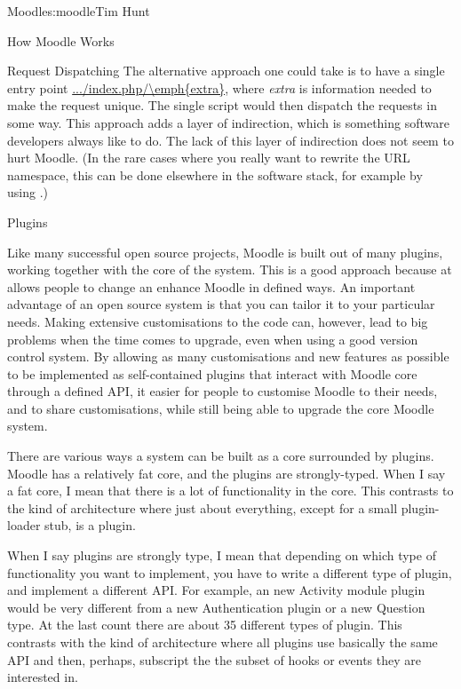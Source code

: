 \begin{aosachapter}{Moodle}{s:moodle}{Tim Hunt}
\begin{aosasect1}{How Moodle Works}
\begin{aosasect2}{Request Dispatching}
The alternative approach one could take is to have a single entry
point \url{.../index.php/\emph{extra}}, where \emph{extra} is
information needed to make the request unique. The single script
 would then dispatch the requests in some way. This
approach adds a layer of indirection, which is something software
developers always like to do. The lack of this layer of indirection
does not seem to hurt Moodle. (In the rare cases where you really want
to rewrite the URL namespace, this can be done elsewhere in the
software stack, for example by using .)

\end{aosasect2}

\begin{aosasect2}{Plugins}

Like many successful open source projects, Moodle is built out of many
plugins, working together with the core of the system. This is a good
approach because at allows people to change an enhance Moodle in
defined ways. An important advantage of an open source system is that
you can tailor it to your particular needs. Making extensive
customisations to the code can, however, lead to big problems when the
time comes to upgrade, even when using a good version control
system. By allowing as many customisations and new features as
possible to be implemented as self-contained plugins that interact
with Moodle core through a defined API, it easier for people to
customise Moodle to their needs, and to share customisations, while
still being able to upgrade the core Moodle system.

There are various ways a system can be built as a core surrounded by
plugins. Moodle has a relatively fat core, and the plugins are
strongly-typed. When I say a fat core, I mean that there is a lot of
functionality in the core. This contrasts to the kind of architecture
where just about everything, except for a small plugin-loader stub, is
a plugin.

When I say plugins are strongly type, I mean that depending on which
type of functionality you want to implement, you have to write a
different type of plugin, and implement a different API. For example,
an new Activity module plugin would be very different from a new
Authentication plugin or a new Question type. At the last count there
are about 35 different types of plugin. This contrasts with the kind
of architecture where all plugins use basically the same API and then,
perhaps, subscript the the subset of hooks or events they are
interested in.


\end{aosasect2}
\end{aosasect1}
\end{aosachapter}
